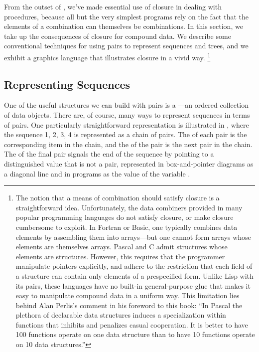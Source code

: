 From the outset of , we’ve made essential use of closure in dealing with procedures, because all but the very simplest programs rely on the fact that the elements of a combination can themselves be combinations.
In this section, we take up the consequences of closure for compound data.
We describe some conventional techniques for using pairs to represent sequences and trees, and we exhibit a graphics language that illustrates closure in a vivid way.%
\footnote{
	The notion that a means of combination should satisfy closure is a straightforward idea.
	Unfortunately, the data combiners provided in many popular programming languages do not satisfy closure, or make closure cumbersome to exploit.
	In Fortran or Basic, one typically combines data elements by assembling them into arrays---but one cannot form arrays whose elements are themselves arrays.
	Pascal and C admit structures whose elements are structures.
	However, this requires that the programmer manipulate pointers explicitly, and adhere to the restriction that each field of a structure can contain only elements of a prespecified form.
	Unlike Lisp with its pairs, these languages have no built-in general-purpose glue that makes it easy to manipulate compound data in a uniform way.
	This limitation lies behind Alan Perlis’s comment in his foreword to this book:
	“In Pascal the plethora of declarable data structures induces a specialization within functions that inhibits and penalizes casual cooperation.
	It is better to have 100 functions operate on one data structure than to have 10 functions operate on 10 data structures.”
}



\subsection{Representing Sequences}
\label{Section 2.2.1}

One of the useful structures we can build with pairs is a ---an ordered collection of data objects.
There are, of course, many ways to represent sequences in terms of pairs.
One particularly straightforward representation is illustrated in , where the sequence 1, 2, 3, 4 is represented as a chain of pairs.
The  of each pair is the corresponding item in the chain, and the  of the pair is the next pair in the chain.
The  of the final pair signals the end of the sequence by pointing to a distinguished value that is not a pair, represented in box-and-pointer diagrams as a diagonal line and in programs as the value of the variable .

